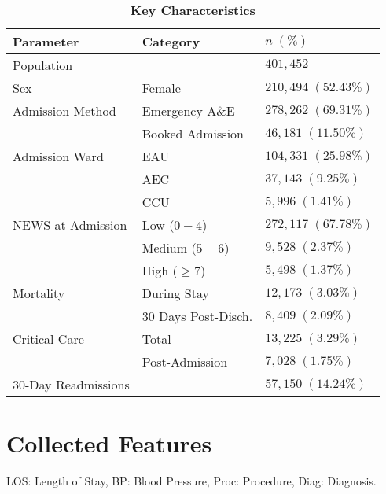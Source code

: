 \documentclass[hf]{ceurart}
\begin{document}
\begin{table}[htbp]
\renewcommand{\arraystretch}{1.2}
    \centering
    \caption{\textbf{Key Characteristics}}
    \begin{tabular}{l l l}
        \toprule
        Parameter            & Category              & $n\;(\%)$           \\
        \midrule
        Population & & $401,452$ \\
        Sex                  & Female                & $210,494\;(52.43\%)$  \\
        Admission Method     & Emergency A\&E        & $278,262\;(69.31\%)$ \\
                             & Booked Admission & $46,181\;(11.50\%)$     \\
        Admission Ward       & EAU                   & $104,331\;(25.98\%)$  \\
                             & AEC                   & $37,143\;(9.25\%)$  \\
                             & CCU         & $5,996\;(1.41\%)$     \\
        NEWS at Admission   & Low ($0-4$)           & $272,117\;(67.78\%)$  \\
                             & Medium ($5-6$)        & $9,528\;(2.37\%)$    \\
                             & High ($\geq 7$)       & $5,498\;(1.37\%)$    \\
        Mortality            & During Stay      & $12,173\;(3.03\%)$    \\
                             & 30 Days Post-Disch.   & $8,409\;(2.09\%)$    \\
        Critical Care        & Total &           $13,225\;(3.29\%)$\\
                             & Post-Admission  & $7,028\;(1.75\%)$    \\
        30-Day Readmissions  &                 & $57,150\;(14.24\%)$    \\
        \bottomrule
    \end{tabular}
\end{table}

\newpage
\clearpage
\section{Collected Features}
LOS: Length of Stay, BP: Blood Pressure, Proc: Procedure, Diag: Diagnosis. 
\end{document}
